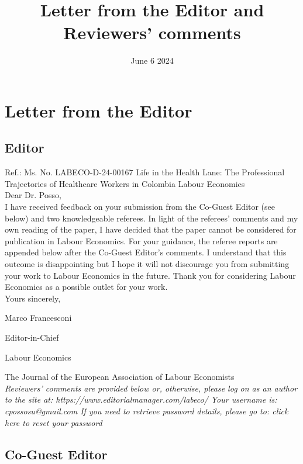 \documentclass[12pt]{article}
\title{Letter from the Editor and Reviewers’ comments}
\date{June 6 2024}
\begin{document}
\maketitle


\section{Letter from the Editor}

\subsection{Editor}

Ref.: Ms. No. LABECO-D-24-00167
Life in the Health Lane: The Professional Trajectories of Healthcare Workers in Colombia
Labour Economics \\

Dear Dr. Posso, \\

I have received feedback on your submission from the Co-Guest Editor (see below) and two knowledgeable referees. In light of the referees' comments and my own reading of the paper, I have decided that the paper cannot be considered for publication in Labour Economics. For your guidance, the referee reports are appended below after the Co-Guest Editor's comments. I understand that this outcome is disappointing but I hope it will not discourage you from submitting your work to Labour Economics in the future. Thank you for considering Labour Economics as a possible outlet for your work. \\

Yours sincerely,

Marco Francesconi

Editor-in-Chief

Labour Economics

The Journal of the European Association of Labour Economists \\

\textit{Reviewers' comments are provided below or, otherwise, please log on as an author
to the site at: https://www.editorialmanager.com/labeco/ Your username is: cpossosu@gmail.com If you need to retrieve password details, please go to: click here to reset your password }   \\

\subsection{Co-Guest Editor}
\end{document}
